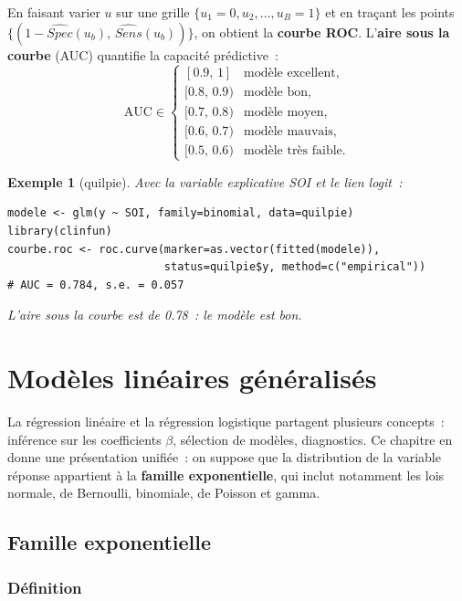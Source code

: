 \documentclass[11pt,letterpaper]{article}
\newtheorem{exemple}{Exemple}[section]
\begin{document}
En faisant varier $u$ sur une grille $\{u_1 = 0, u_2, \ldots, u_B = 1\}$ et en traçant les points $\{(1-\widehat{Spec}(u_b),\, \widehat{Sens}(u_b))\}$, on obtient la \textbf{courbe ROC}. L'\textbf{aire sous la courbe} (AUC) quantifie la capacité prédictive~:
$$\mbox{AUC} \in \begin{cases}
[0.9,\,1] & \mbox{modèle excellent},\\
[0.8,\,0.9) & \mbox{modèle bon},\\
[0.7,\,0.8) & \mbox{modèle moyen},\\
[0.6,\,0.7) & \mbox{modèle mauvais},\\
[0.5,\,0.6) & \mbox{modèle très faible}.
\end{cases}$$

\begin{exemple}[\textsf{quilpie}]
Avec la variable explicative SOI et le lien logit~:
\begin{verbatim}
modele <- glm(y ~ SOI, family=binomial, data=quilpie)
library(clinfun)
courbe.roc <- roc.curve(marker=as.vector(fitted(modele)),
                        status=quilpie$y, method=c("empirical"))
# AUC = 0.784, s.e. = 0.057
\end{verbatim}
L'aire sous la courbe est de 0.78~: le modèle est bon.
\end{exemple}

\newpage
\section{Modèles linéaires généralisés}
\label{sec:mlg}

La régression linéaire et la régression logistique partagent plusieurs concepts~: inférence sur les coefficients $\beta$, sélection de modèles, diagnostics. Ce chapitre en donne une présentation unifiée~: on suppose que la distribution de la variable réponse appartient à la \textbf{famille exponentielle}, qui inclut notamment les lois normale, de Bernoulli, binomiale, de Poisson et gamma.

\subsection{Famille exponentielle}

\subsubsection{Définition}
\end{document}
